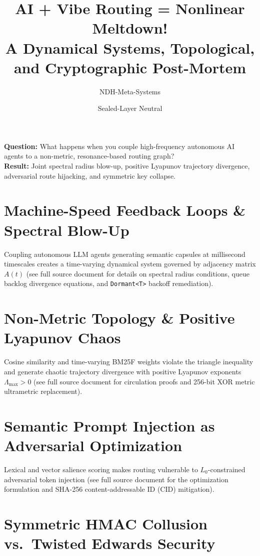 \documentclass[11pt,a4paper]{article}
\title{\textbf{AI + Vibe Routing = Nonlinear Meltdown!}\\
\large A Dynamical Systems, Topological, and Cryptographic Post-Mortem}
\author{NDH-Meta-Systems}
\date{Sealed-Layer Neutral}
\begin{document}
\maketitle

\begin{tcolorbox}[colback=gray!5!white,colframe=black!75!black,title=\textbf{Experiment Overview}]
\textbf{Question:} What happens when you couple high-frequency autonomous AI agents to a non-metric, resonance-based routing graph?\\
\textbf{Result:} Joint spectral radius blow-up, positive Lyapunov trajectory divergence, adversarial route hijacking, and symmetric key collapse.
\end{tcolorbox}

\section{Machine-Speed Feedback Loops \& Spectral Blow-Up}

Coupling autonomous LLM agents generating semantic capsules at millisecond timescales creates a time-varying dynamical system governed by adjacency matrix $A(t)$ (see full source document for details on spectral radius conditions, queue backlog divergence equations, and \texttt{Dormant<T>} backoff remediation).

\section{Non-Metric Topology \& Positive Lyapunov Chaos}

Cosine similarity and time-varying BM25F weights violate the triangle inequality and generate chaotic trajectory divergence with positive Lyapunov exponents $\Lambda_{\max} > 0$ (see full source document for circulation proofs and 256-bit XOR metric ultrametric replacement).

\section{Semantic Prompt Injection as Adversarial Optimization}

Lexical and vector salience scoring makes routing vulnerable to $L_0$-constrained adversarial token injection (see full source document for the optimization formulation and SHA-256 content-addressable ID (CID) mitigation).

\section{Symmetric HMAC Collusion vs.\ Twisted Edwards Security}
\end{document}
